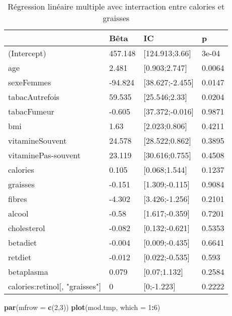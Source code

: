 \documentclass[]{article}
\newenvironment{Shaded}{\begin{snugshade}}{\end{snugshade}}
\newcommand{\KeywordTok}[1]{\textcolor[rgb]{0.13,0.29,0.53}{\textbf{#1}}}
\newcommand{\DataTypeTok}[1]{\textcolor[rgb]{0.13,0.29,0.53}{#1}}
\newcommand{\DecValTok}[1]{\textcolor[rgb]{0.00,0.00,0.81}{#1}}
\newcommand{\OperatorTok}[1]{\textcolor[rgb]{0.81,0.36,0.00}{\textbf{#1}}}
\newcommand{\NormalTok}[1]{#1}
\begin{document}
\begin{table}

\caption{\label{tab:unnamed-chunk-74}Régression linéaire multiple avec interraction entre calories et graisses}
\centering
\begin{tabular}[t]{l|l|l|l}
\hline
  & Bêta & IC & p\\
\hline
\rowcolor[HTML]{BBD2E1}  (Intercept) & 457.148 & [124.913;3.66] & 3e-04\\
\hline
age & 2.481 & [0.903;2.747] & 0.0064\\
\hline
\rowcolor[HTML]{BBD2E1}  sexeFemmes & -94.824 & [38.627;-2.455] & 0.0147\\
\hline
tabacAutrefois & 59.535 & [25.546;2.33] & 0.0204\\
\hline
\rowcolor[HTML]{BBD2E1}  tabacFumeur & -0.605 & [37.372;-0.016] & 0.9871\\
\hline
bmi & 1.63 & [2.023;0.806] & 0.4211\\
\hline
\rowcolor[HTML]{BBD2E1}  vitamineSouvent & 24.578 & [28.522;0.862] & 0.3895\\
\hline
vitaminePas-souvent & 23.119 & [30.616;0.755] & 0.4508\\
\hline
\rowcolor[HTML]{BBD2E1}  calories & 0.105 & [0.068;1.544] & 0.1237\\
\hline
graisses & -0.151 & [1.309;-0.115] & 0.9084\\
\hline
\rowcolor[HTML]{BBD2E1}  fibres & -4.302 & [3.426;-1.256] & 0.2101\\
\hline
alcool & -0.58 & [1.617;-0.359] & 0.7201\\
\hline
\rowcolor[HTML]{BBD2E1}  cholesterol & -0.082 & [0.132;-0.621] & 0.5353\\
\hline
betadiet & -0.004 & [0.009;-0.435] & 0.6641\\
\hline
\rowcolor[HTML]{BBD2E1}  retdiet & -0.012 & [0.022;-0.535] & 0.593\\
\hline
betaplasma & 0.079 & [0.07;1.132] & 0.2584\\
\hline
\rowcolor[HTML]{BBD2E1}  calories:retinol[, "graisses"] & 0 & [0;-1.223] & 0.2222\\
\hline
\end{tabular}
\end{table}

\begin{Shaded}
\begin{Highlighting}[]
\KeywordTok{par}\NormalTok{(}\DataTypeTok{mfrow =} \KeywordTok{c}\NormalTok{(}\DecValTok{2}\NormalTok{,}\DecValTok{3}\NormalTok{))}
\KeywordTok{plot}\NormalTok{(mod.tmp, }\DataTypeTok{which =} \DecValTok{1}\OperatorTok{:}\DecValTok{6}\NormalTok{)}
\end{Highlighting}
\end{Shaded}
\end{document}
